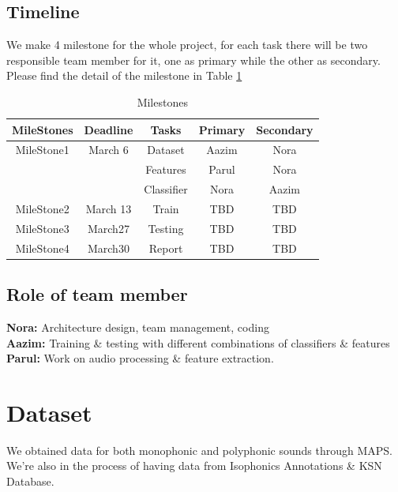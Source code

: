 \documentclass{article}
\begin{document}
\subsection{Timeline}\label{subsec:Timeline}
We make 4 milestone for the whole project, for each task there will be two responsible team member for it, one as primary while the other as secondary. Please find the detail of the milestone in Table \ref{table1}
\begin{table}[h]
 \begin{center}
  \caption{Milestones}
\begin{tabular}{c|c|c|c|c}
        \toprule
         MileStones & Deadline & Tasks & Primary & Secondary  \\
       \midrule
        MileStone1 & March 6 & Dataset & Aazim & Nora \\
         &  & Features   & Parul & Nora \\
         &  & Classifier  & Nora & Aazim \\
        \midrule
        MileStone2 & March 13 & Train & TBD  &  TBD    \\
        \midrule
        MileStone3 & March27 & Testing & TBD &  TBD   \\
                \midrule
        MileStone4 & March30 & Report &TBD  & TBD    \\
        \bottomrule
\end{tabular}
\end{center}
 \label{table1}
\end{table}


\subsection{Role of team member}\label{subsec:Role of team member}
\textbf{Nora:} Architecture design, team management, coding\\
\textbf{Aazim:} Training \& testing with different combinations of classifiers \& features\\
\textbf{Parul:} Work on audio processing \& feature extraction. 
 
%
\section{Dataset}\label{sec:Dataset}
We obtained data for both monophonic and polyphonic sounds through MAPS. We're also in the process of having data from Isophonics Annotations \& KSN Database. 
\end{document}
